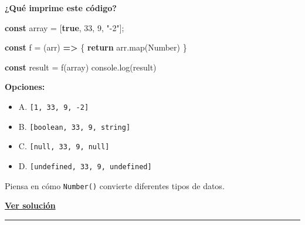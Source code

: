 \documentclass[
  letterpaper,
  DIV=11,
  numbers=noendperiod]{scrreprt}
\newenvironment{Shaded}{\begin{snugshade}}{\end{snugshade}}
\newcommand{\BuiltInTok}[1]{\textcolor[rgb]{0.00,0.23,0.31}{#1}}
\newcommand{\ControlFlowTok}[1]{\textcolor[rgb]{0.00,0.23,0.31}{\textbf{#1}}}
\newcommand{\DecValTok}[1]{\textcolor[rgb]{0.68,0.00,0.00}{#1}}
\newcommand{\FunctionTok}[1]{\textcolor[rgb]{0.28,0.35,0.67}{#1}}
\newcommand{\KeywordTok}[1]{\textcolor[rgb]{0.00,0.23,0.31}{\textbf{#1}}}
\newcommand{\NormalTok}[1]{\textcolor[rgb]{0.00,0.23,0.31}{#1}}
\newcommand{\OperatorTok}[1]{\textcolor[rgb]{0.37,0.37,0.37}{#1}}
\newcommand{\StringTok}[1]{\textcolor[rgb]{0.13,0.47,0.30}{#1}}
\providecommand{\tightlist}{%
  \setlength{\itemsep}{0pt}\setlength{\parskip}{0pt}}
\begin{document}
\textbf{¿Qué imprime este código?}

\begin{Shaded}
\begin{Highlighting}[]
\KeywordTok{const}\NormalTok{ array }\OperatorTok{=}\NormalTok{ [}\KeywordTok{true}\OperatorTok{,} \DecValTok{33}\OperatorTok{,} \DecValTok{9}\OperatorTok{,} \StringTok{"{-}2"}\NormalTok{]}\OperatorTok{;}

\KeywordTok{const}\NormalTok{ f }\OperatorTok{=}\NormalTok{ (arr) }\KeywordTok{=\textgreater{}}\NormalTok{ \{}
  \ControlFlowTok{return}\NormalTok{ arr}\OperatorTok{.}\FunctionTok{map}\NormalTok{(}\BuiltInTok{Number}\NormalTok{)}
\NormalTok{\}}

\KeywordTok{const}\NormalTok{ result }\OperatorTok{=} \FunctionTok{f}\NormalTok{(array)}
\BuiltInTok{console}\OperatorTok{.}\FunctionTok{log}\NormalTok{(result)}
\end{Highlighting}
\end{Shaded}

\textbf{Opciones:}

\begin{itemize}
\tightlist
\item
  A. \texttt{{[}1,\ 33,\ 9,\ -2{]}}
\item
  B. \texttt{{[}boolean,\ 33,\ 9,\ string{]}}
\item
  C. \texttt{{[}null,\ 33,\ 9,\ null{]}}
\item
  D. \texttt{{[}undefined,\ 33,\ 9,\ undefined{]}}
\end{itemize}

\begin{tcolorbox}[enhanced jigsaw, left=2mm, toprule=.15mm, leftrule=.75mm, breakable, colback=white, coltitle=black, bottomtitle=1mm, arc=.35mm, rightrule=.15mm, colframe=quarto-callout-tip-color-frame, opacitybacktitle=0.6, toptitle=1mm, opacityback=0, titlerule=0mm, title=\textcolor{quarto-callout-tip-color}{\faLightbulb}\hspace{0.5em}{Pista}, bottomrule=.15mm, colbacktitle=quarto-callout-tip-color!10!white]

Piensa en cómo \texttt{Number()} convierte diferentes tipos de datos.

\end{tcolorbox}

\textbf{\hyperref[sec-sol-cap1-reto1]{Ver solución}}

\begin{center}\rule{0.5\linewidth}{0.5pt}\end{center}
\end{document}
